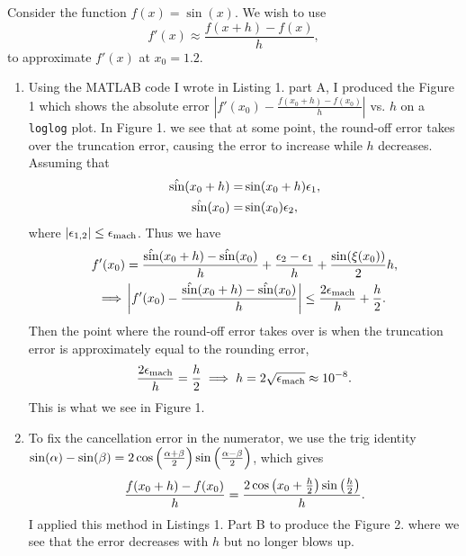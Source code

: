 \documentclass[12pt]{report}
\begin{document}
\begin{solution}



    \noindent
    Consider the function $f(x) = \sin(x)$. We wish to use 
    \[ 
        f'(x) \approx \frac{f(x + h) - f(x)}{h},
    \]
    to approximate $f'(x)$ at $x_0 = 1.2$. 
    
    \begin{enumerate}
        \item 
        Using the MATLAB code I wrote in Listing 1. part A, I produced the Figure 1 which shows the absolute error $\left| f'(x_0) - \frac{f(x_0 + h) - f(x_0)}{h} \right|$ vs. $h$ on a \verb+loglog+ plot. In Figure 1. we see that at some point, the round-off error takes over the truncation error, causing the error to increase while $h$ decreases. Assuming that
        \begin{align*}
            \hat{\sin}(x_0 + h) =& \sin(x_0 + h) {\epsilon}_1,\\
            \hat{\sin}(x_0) = &\sin(x_0) {\epsilon}_2,\\
        \end{align*}
        where $|{\epsilon}_{1,2}| \leq {\epsilon}_{\text{mach}}$. Thus we have
        \begin{align*}
            f'(x_0) &= \frac{ \hat{\sin}(x_0 + h) - \hat{\sin}(x_0)}{h} + \frac{{\epsilon}_2 - {\epsilon}_1}{h} + \frac{\sin(\xi(x_0))}{2}h,\\
            \implies &\left| f'(x_0) - \frac{ \hat{\sin}(x_0 + h) - \hat{\sin}(x_0)}{h}\right| \leq \frac{2{\epsilon}_{\text{mach}}}{h} + \frac{h}{2}.
        \end{align*}
        Then the point where the round-off error takes over is when the truncation error is approximately equal to the rounding error,
        \[ 
            \frac{2{\epsilon}_{\text{mach}}}{h} = \frac{h}{2} \implies h = 2\sqrt{{\epsilon}_{\text{mach}}} \approx 10^{-8}.
        \]
        This is what we see in Figure 1.

        \item 
        To fix the cancellation error in the numerator, we use the trig identity $\sin(\alpha) - \sin(\beta) = 2\cos{\left(\frac{\alpha + \beta}{2}\right)}\sin{\left(\frac{\alpha - \beta}{2}\right)}$, which gives
        \[ 
            \frac{f(x_0 + h) - f(x_0)}{h} = \frac{2\cos{\left(x_0 + \frac{h}{2}\right)}\sin{\left(\frac{h}{2}\right)}}{h}.
        \]
        I applied this method in Listings 1. Part B to produce the Figure 2. where we see that the error decreases with $h$ but no longer blows up. 
    \end{enumerate}



    
\end{solution}
\end{document}
